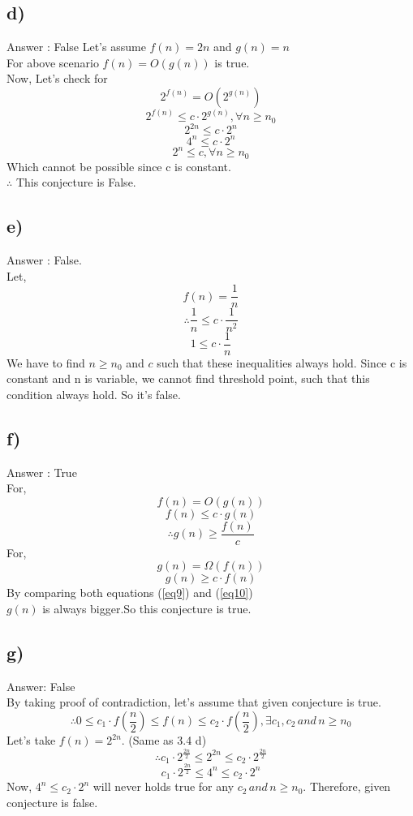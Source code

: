 \documentclass[a4paper, 11pt]{article}
\begin{document}
\subsection*{d)}
Answer : False
Let's assume $f(n) =  2n$ and $g(n)=n$\\
For above scenario $f(n) = O(g(n))$ is true.\\
Now, Let's check for $$2^{f(n)} = O(2^{g(n)})$$
$$2^{f(n)} \le c \cdot 2^{g(n)} , \forall n \ge n_{0}$$
$$2^{2n} \le c \cdot 2^n$$
$$4^n \le c \cdot 2^n$$
$$2^n \le c , \forall n \ge n_{0}$$
Which cannot be possible since c is constant.\\
$\therefore$ This conjecture is False.

\subsection*{e)}
Answer : False.\\
Let, $$f(n) = \frac{1}{n}$$
$$\therefore \frac {1}{n} \le c \cdot \frac{1}{n^2}$$
$$ 1 \le c \cdot \frac {1}{n}$$
We have to find $n \ge n_{0}$ and $c$ such that these inequalities always hold. Since c is constant and n is variable, we cannot find threshold point, such that this condition always hold. So it's false.

\subsection*{f)}
Answer : True\\
For,
$$f(n) = O(g(n))$$
$$f(n) \le c \cdot g(n)$$
\begin{equation}
\label{eq9}
\therefore g(n) \ge \frac {f(n)}{c}  
\end{equation}
For,
$$g(n) = \Omega (f(n))$$
\begin{equation}
\label{eq10}
g(n) \ge c \cdot f(n)
\end{equation}
By comparing both equations (\ref{eq9}) and (\ref{eq10}) \\
$g(n)$ is always bigger.So this conjecture is true.

\subsection*{g)}
Answer: False \\
By taking proof of contradiction, let's assume that given conjecture is true.
$$\therefore 0 \le c_{1} \cdot f(\frac{n}{2}) \le f(n) \le c_{2} \cdot f(\frac{n}{2}) , \exists c_{1}, c_{2} \, and \, n \ge n_{0}$$
Let's take $f(n) = 2^{2n}$. (Same as 3.4 d) 
$$\therefore c_{1} \cdot 2^{\frac{2n}{2}} \le 2^{2n} \le c_{2} \cdot 2^{\frac{2n}{2}}$$
$$c_{1} \cdot 2^{\frac{2n}{2}} \le 4^{n} \le c_{2} \cdot 2^n$$
Now, $4^n \le c_{2} \cdot 2^n $ will never holds true for any $c_{2} \, and \, n \ge n_{0}$. Therefore, given conjecture is false.
\end{document}
